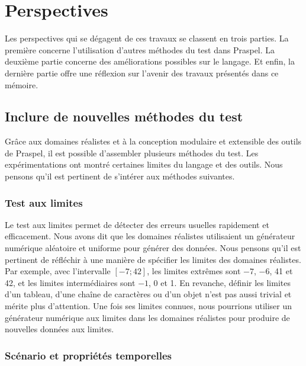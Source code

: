 \chapter{Perspectives}
\label{chapter:perspectives}

\minitoc

Les perspectives qui se dégagent de ces travaux se classent en trois parties. La
première concerne l'utilisation d'autres méthodes du test dans Praspel. La
deuxième partie concerne des améliorations possibles sur le langage. Et enfin,
la dernière partie offre une réflexion sur l'avenir des travaux présentés dans
ce mémoire.

\section{Inclure de nouvelles méthodes du test}

Grâce aux domaines réalistes et à la conception modulaire et extensible des
outils de Praspel, il est possible d'assembler plusieurs méthodes du test. Les
expérimentations ont montré certaines limites du langage et des outils. Nous
pensons qu'il est pertinent de s'intérer aux méthodes suivantes.

\subsection{Test aux limites}

Le test aux limites permet de détecter des erreurs usuelles rapidement et
efficacement. Nous avons dit que les domaines réalistes utilisaient un
générateur numérique aléatoire et uniforme pour générer des données. Nous
pensons qu'il est pertinent de réfléchir à une manière de spécifier les limites
des domaines réalistes. Par exemple, avec l'intervalle $[-7; 42]$, les limites
extrêmes sont $-7$, $-6$, 41 et 42, et les limites intermédiaires sont $-1$, 0
et 1. En revanche, définir les limites d'un tableau, d'une chaîne de caractères
ou d'un objet n'est pas aussi trivial et mérite plus d'attention. Une fois ses
limites connues, nous pourrions utiliser un générateur numérique aux limites
dans les domaines réalistes pour produire de nouvelles données aux limites.

\subsection{Scénario et propriétés temporelles}


